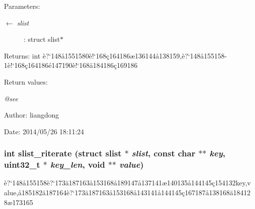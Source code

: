 \begin{Desc}
\item[Parameters:]
\begin{description}
\item[\mbox{$\leftarrow$} {\em slist}]: struct slist$\ast$ \end{description}
\end{Desc}
\begin{Desc}
\item[Returns:]int \`{e}?`148\aa{}1551580\`{e}!`168\c{c}164186\ae{}136144\aa{}138159,\`{e}?`148\aa{}155158-1\`{e}!`168\c{c}164186\'{e}147190\`{e}!`168\"{a}184186\c{c}169186 \end{Desc}
\begin{Desc}
\item[Return values:]
\begin{description}
\item[{\em @see}]\end{description}
\end{Desc}
\begin{Desc}
\item[Author:]liangdong \end{Desc}
\begin{Desc}
\item[Date:]2014/05/26 18:11:24 \end{Desc}
\subsubsection{\setlength{\rightskip}{0pt plus 5cm}int slist\_\-riterate (struct slist $\ast$ {\em slist}, const char $\ast$$\ast$ {\em key}, uint32\_\-t $\ast$ {\em key\_\-len}, void $\ast$$\ast$ {\em value})}\label{slist_8h_a14}


\`{e}?`148\aa{}155158\`{e}?`173\"{a}187163\aa{}153168\aa{}189147\aa{}137141\ae{}140135\aa{}144145\c{c}154132key,value,\aa{}185182\"{a}187164\`{e}?`173\"{a}187163\aa{}153168\aa{}143141\aa{}144145\c{c}167187\aa{}138168\"{a}184128\ae{}173165 

